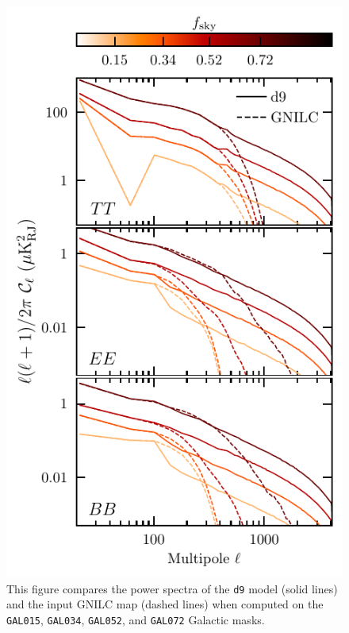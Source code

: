\documentclass[twocolumn]{aastex631}
\newcommand{\dnine}{{\tt d9}}
\begin{document}
\begin{figure}
    \centering
    \includegraphics{paper_spectra_by_field_NSIDE2048.pdf}
    \caption{This figure compares the power spectra of the \dnine{} model (solid lines) and the input GNILC map (dashed lines) when computed on the \texttt{GAL015}, \texttt{GAL034}, \texttt{GAL052}, and \texttt{GAL072} Galactic masks.}
    \label{fig:spectra_by_field}
\end{figure}
\end{document}
